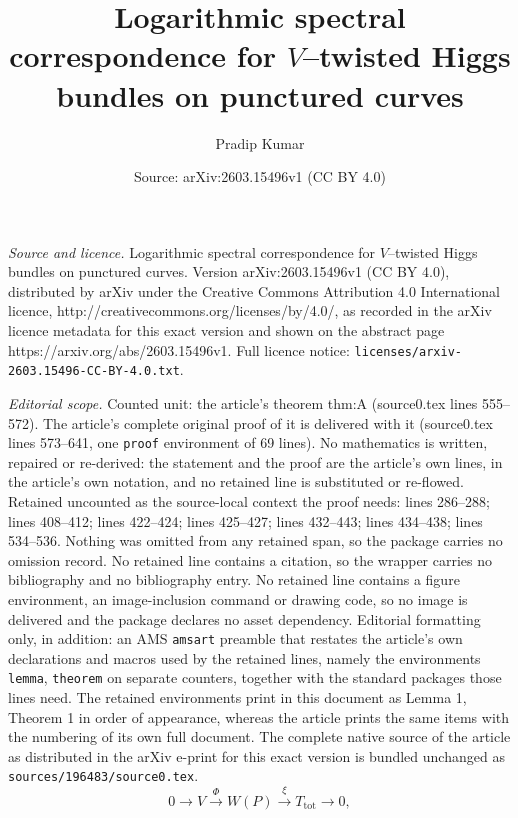 \documentclass[10pt,a4paper]{amsart}
\title{Logarithmic spectral correspondence for $V$--twisted Higgs bundles on punctured curves}
\author{Pradip Kumar}
\date{Source: arXiv:2603.15496v1 (CC BY 4.0)}
\begin{document}
\maketitle

\noindent\emph{Source and licence.} Logarithmic spectral correspondence for $V$--twisted Higgs bundles on punctured curves. Version arXiv:2603.15496v1 (CC BY 4.0), distributed by arXiv under the Creative Commons Attribution 4.0 International licence, http://creativecommons.org/licenses/by/4.0/, as recorded in the arXiv licence metadata for this exact version and shown on the abstract page https://arxiv.org/abs/2603.15496v1. Full licence notice: \texttt{licenses/arxiv-2603.15496-CC-BY-4.0.txt}.\par\smallskip

\noindent\textit{Editorial scope.} Counted unit: the article's theorem thm:A (source0.tex lines 555--572). The article's complete original proof of it is delivered with it (source0.tex lines 573--641, one \texttt{proof} environment of 69 lines). No mathematics is written, repaired or re-derived: the statement and the proof are the article's own lines, in the article's own notation, and no retained line is substituted or re-flowed.  Retained uncounted as the source-local context the proof needs: lines 286--288; lines 408--412; lines 422--424; lines 425--427; lines 432--443; lines 434--438; lines 534--536.  Nothing was omitted from any retained span, so the package carries no omission record.  No retained line contains a citation, so the wrapper carries no bibliography and no bibliography entry.  No retained line contains a figure environment, an image-inclusion command or drawing code, so no image is delivered and the package declares no asset dependency.  Editorial formatting only, in addition: an AMS \texttt{amsart} preamble that restates the article's own declarations and macros used by the retained lines, namely the environments \texttt{lemma}, \texttt{theorem} on separate counters, together with the standard packages those lines need.  The retained environments print in this document as Lemma 1, Theorem 1 in order of appearance, whereas the article prints the same items with the numbering of its own full document.  The complete native source of the article as distributed in the arXiv e-print for this exact version is bundled unchanged as \texttt{sources/196483/source0.tex}.
\begin{equation}\label{eq:log-hecke}
0\longrightarrow V \xrightarrow{\ \Phi\ } W(P)\xrightarrow{\ \xi\ } T_{\mathrm{tot}}\longrightarrow 0,
\end{equation}
\end{document}
